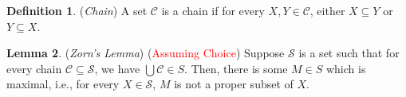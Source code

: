 \documentclass[14pt]{article}
\theoremstyle{definition}
\newtheorem{definition}{Definition}[subsection]
\newtheorem{lemma}[definition]{Lemma}
\begin{document}
\vspace{2mm}

\begin{definition}
    (\textit{Chain}) A set $\mathcal{C}$ is a chain if for every $X, Y\in \mathcal{C}$, either $X\subseteq Y$
    or $Y\subseteq X$.
\end{definition}

\vspace{2mm}

\begin{lemma}
    (\textit{Zorn's Lemma}) (\textcolor{red}{Assuming Choice}) Suppose $\mathcal{S}$ is a set such that
    for every chain $\mathcal{C}\subseteq \mathcal{S}$, we have $\bigcup \mathcal{C}\in S$. Then, 
    there is some $M\in S$ which is maximal, i.e.,  for every $X\in \mathcal{S}$, $M$ is 
    not a proper subset of $X$. 
\end{lemma}
\end{document}
